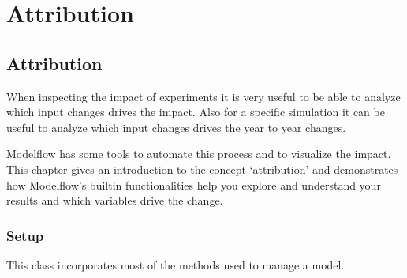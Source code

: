 \documentclass[letterpaper,10pt,english]{jupyterBook}
\begin{document}
\part{Attribution}

\sphinxstepscope


\chapter{Attribution}
\label{\detokenize{content/howto/attribution/Attribution background:attribution}}\label{\detokenize{content/howto/attribution/Attribution background::doc}}
\sphinxAtStartPar
When inspecting the impact of experiments it is very useful to be able to analyze which input changes drives the impact. Also for a specific simulation it can be useful to analyze which input changes drives the year to year changes.

\sphinxAtStartPar
Modelflow has some tools to automate this process and to visualize the impact. This chapter gives an introduction to the concept ‘attribution’ and demonstrates how Modelflow’s built\sphinxhyphen{}in functionalities help you explore and understand your results and which variables drive the change.


\section{Setup}
\label{\detokenize{content/howto/attribution/Attribution background:setup}}
\sphinxAtStartPar
This class incorporates most of the methods used to manage a model.
\end{document}
